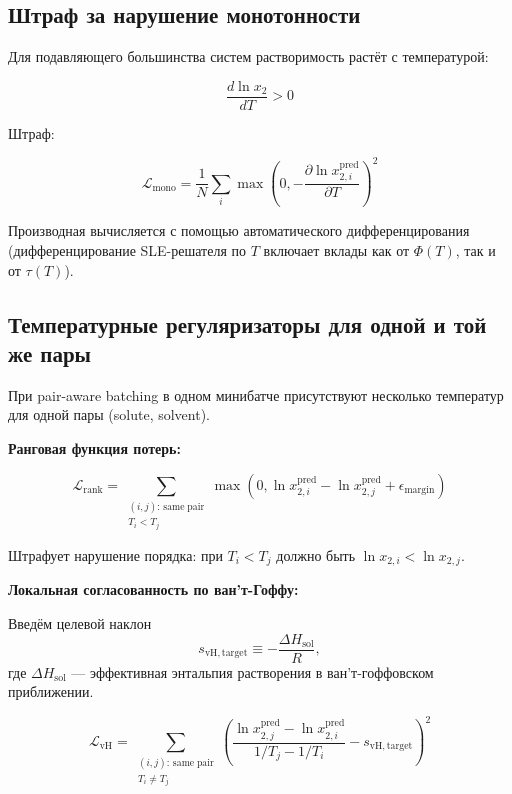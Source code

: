 \documentclass[11pt]{article}
\begin{document}
\subsection{Штраф за нарушение монотонности}

Для подавляющего большинства систем растворимость растёт с температурой:

\begin{equation*}
\frac{d\ln x_2}{dT} > 0
\end{equation*}

Штраф:

\begin{equation*}
\mathcal{L}_{\mathrm{mono}} = \frac{1}{N} \sum_i \max\!\left(0, -\frac{\partial \ln x_{2,i}^{\mathrm{pred}}}{\partial T}\right)^2
\end{equation*}

Производная вычисляется с помощью автоматического дифференцирования (дифференцирование SLE-решателя по $T$ включает вклады как от $\Phi(T)$, так и от $\tau(T)$).

\subsection{Температурные регуляризаторы для одной и той же пары}

При pair-aware batching в одном минибатче присутствуют несколько температур для одной пары (solute, solvent).

\textbf{Ранговая функция потерь:}

\begin{equation*}
\mathcal{L}_{\mathrm{rank}} = \sum_{\substack{(i,j):\, \mathrm{same\;pair} \\ T_i < T_j}} \max\!\left(0, \ln x_{2,i}^{\mathrm{pred}} - \ln x_{2,j}^{\mathrm{pred}} + \epsilon_{\mathrm{margin}}\right)
\end{equation*}

Штрафует нарушение порядка: при $T_i < T_j$ должно быть $\ln x_{2,i} < \ln x_{2,j}$.

\textbf{Локальная согласованность по ван'т-Гоффу:}

Введём целевой наклон
\begin{equation*}
s_{\mathrm{vH,target}} \equiv -\frac{\Delta H_{\mathrm{sol}}}{R},
\end{equation*}
где $\Delta H_{\mathrm{sol}}$ --- эффективная энтальпия растворения в ван'т-гоффовском приближении.

\begin{equation*}
\mathcal{L}_{\mathrm{vH}} = \sum_{\substack{(i,j):\, \mathrm{same\;pair} \\ T_i \neq T_j}} \left(\frac{\ln x_{2,j}^{\mathrm{pred}} - \ln x_{2,i}^{\mathrm{pred}}}{1/T_j - 1/T_i} - s_{\mathrm{vH,target}}\right)^2
\end{equation*}
\end{document}
